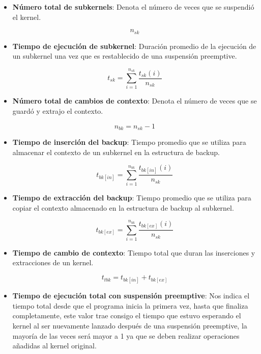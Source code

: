 \begin{itemize}

\item \textbf{Número total de subkernels}: Denota el número de veces que se suspendió el kernel.

\begin{equation}
n_{sk} 
\end{equation}

\item \textbf{Tiempo de ejecución de subkernel}: Duración promedio de la ejecución de un subkernel una vez que es restablecido de una suspensión preemptive.

\begin{equation}
t_{sk}= \sum_{i=1}^{n_{sk}} \frac{t_{sk}(i) }{ n_{sk} }
\end{equation}

\item \textbf{Número total de cambios de contexto}: Denota el número de veces que se guardó y extrajo el contexto.

\begin{equation}
n_{bk}=n_{sk}-1
\end{equation}

\item \textbf{Tiempo de inserción del backup}: Tiempo promedio que se utiliza para almacenar el contexto de un subkernel en la estructura de backup.

\begin{equation}
t_{bk[in]}= \sum_{i=1}^{n_{bk}} \frac{t_{bk[in]}(i) }{ n_{sk} }
\end{equation}

\item \textbf{Tiempo de extracción del backup}: Tiempo promedio que se utiliza para copiar el contexto almacenado en la estructura de backup al subkernel.

\begin{equation}
t_{bk[ex]}= \sum_{i=1}^{n_{bk}} \frac{t_{bk[ex]}(i) }{ n_{sk} }
\end{equation}

\item \textbf{Tiempo de cambio de contexto}: Tiempo total que duran las inserciones y extracciones de un kernel.

\begin{equation}
t_{tbk} = t_{bk[in]} + t_{bk[ex]}
\end{equation}

\item \textbf{Tiempo de ejecución total con suspensión preemptive}: Nos indica el tiempo total desde que el programa inicia la primera vez, hasta que finaliza completamente, este valor trae consigo el tiempo que estuvo esperando el kernel al ser nuevamente lanzado después de una suspensión preemptive, la mayoría de las veces será mayor a 1 ya que se deben realizar operaciones añadidas al kernel original.


\end{itemize}

